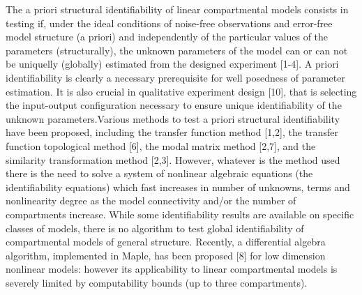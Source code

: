 The a priori structural identifiability of linear compartmental models consists in testing if, under
the ideal conditions of noise-free observations and error-free model structure (a priori) and
independently of the particular values of the parameters (structurally), the unknown parameters of
the model can or can not be uniquelly (globally) estimated from the designed experiment [1-4]. A
priori identifiability is clearly a necessary prerequisite for well posedness of parameter estimation.
It is also crucial in qualitative experiment design [10], that is selecting the input-output
configuration necessary to ensure unique identifiability of the unknown parameters.Various
methods to test a priori structural identifiability have been proposed, including the transfer
function method [1,2], the transfer function topological method [6], the modal matrix method
[2,7], and the similarity transformation method [2,3]. However, whatever is the method used there
is the need to solve a system of nonlinear algebraic equations (the identifiability equations) which
fast increases in number of unknowns, terms and nonlinearity degree as the model connectivity
and/or the number of compartments increase. While some identifiability results are available on
specific classes of models, there is no algorithm to test global identifiability of compartmental
models of general structure. Recently, a differential algebra algorithm, implemented in Maple, has
been proposed [8] for low dimension nonlinear models: however its applicability to linear
compartmental models is severely limited by computability bounds (up to three compartments). 

